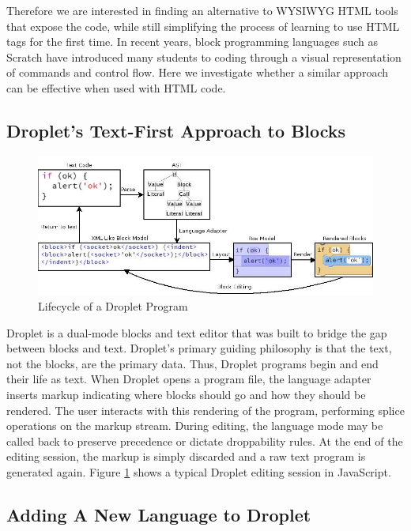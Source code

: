 \documentclass[conference]{IEEEtran}
\begin{document}
Therefore we are interested in finding an alternative to WYSIWYG HTML tools that expose the code, while still simplifying the process of learning to use HTML tags for the first time.  In recent years, block programming languages such as Scratch \cite{Scratch} have introduced many students to coding through a visual representation of commands and control flow.  Here we investigate whether a similar approach can be effective when used with HTML code.

\subsection{Droplet's Text-First Approach to Blocks}

\begin{figure}
\centering
\includegraphics[width=5in]{image11.jpg}
\caption{Lifecycle of a Droplet Program}
\label{lifecycle}
\end{figure}

Droplet \cite{Droplet} is a dual-mode blocks and text editor that was built to bridge the gap between blocks and text. Droplet's primary guiding philosophy is that the text, not the blocks, are the primary data. Thus, Droplet programs begin and end their life as text. When Droplet opens a program file, the language adapter inserts markup indicating where blocks should go and how they should be rendered. The user interacts with this rendering of the program, performing splice operations on the markup stream. During editing, the language mode may be called back to preserve precedence or dictate droppability rules. At the end of the editing session, the markup is simply discarded and a raw text program is generated again. Figure \ref{lifecycle} shows a typical Droplet editing session in JavaScript.

\subsection{Adding A New Language to Droplet}
\end{document}
